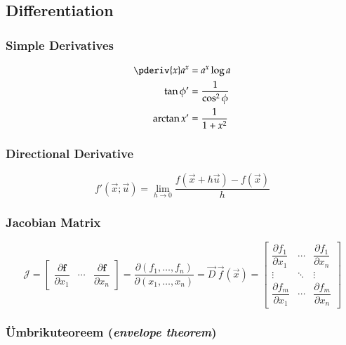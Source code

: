 \documentclass[a4paper]{article}
\numberwithin{equation}{subsection}
\begin{document}
\subsection{Differentiation}

\subsubsection{Simple Derivatives}

\begin{align}
  \pderiv{x} a^{x} &= a^{x} \log a
  \\
  \tan \phi' &= \frac{1}{\cos^2 \phi} 
  \\
  \arctan x' &= \frac{1}{1+x^2}
\end{align}


\subsubsection{Directional Derivative}

\begin{equation}
  f'(\vec{x}; \vec{u})
  =
  \lim_{h \to 0}
  \frac{f(\vec{x} + h\vec{u}) - f(\vec{x})}
  {h}
\end{equation}


\subsubsection{Jacobian Matrix}
\label{sec:jacobian_matrix}

\begin{equation}
  \mathcal{J} = 
  \begin{bmatrix}
    \dfrac{\partial \mathbf{f}}{\partial x_1} & \cdots &
    \dfrac{\partial \mathbf{f}}{\partial x_n} 
  \end{bmatrix}
  = 
  \frac{\partial (f_1, \dots, f_n)}
  {\partial (x_1, \dots, x_n)}
  =
  \vec{D}\,\vec{f}(\vec{x})
  =
  \begin{bmatrix}
    \dfrac{\partial f_1}{\partial x_1} & \cdots & \dfrac{\partial f_1}{\partial x_n}\\
    \vdots & \ddots & \vdots\\
    \dfrac{\partial f_m}{\partial x_1} & \cdots & \dfrac{\partial
      f_m}{\partial x_n} 
  \end{bmatrix}
\end{equation}



\subsubsection{Ümbrikuteoreem  (\emph{{envelope theorem}})}
\label{sec:envelope_theorem}
\end{document}

